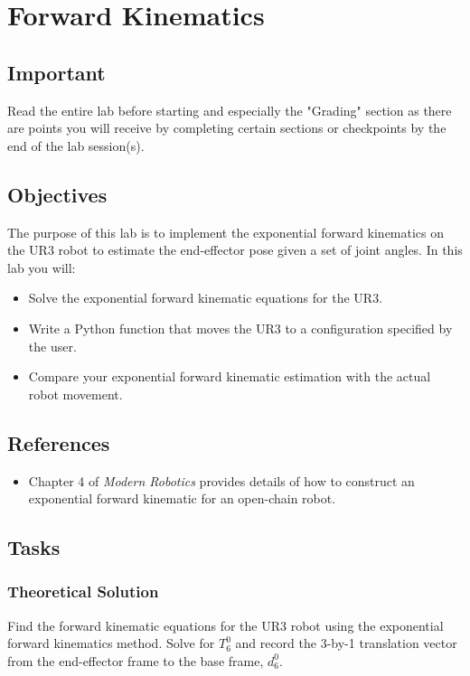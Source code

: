 \chapter{Forward Kinematics}
\section{Important}
Read the entire lab before starting and especially the "Grading" section as there are points you will receive by completing certain sections or checkpoints
by the end of the lab session(s). 
\section{Objectives}
The purpose of this lab is to implement the exponential forward kinematics on the UR3 robot to estimate the end-effector pose given a set of joint angles.  In this lab you will:
\begin{itemize}
	\item Solve the exponential forward kinematic equations for the UR3.
	\item Write a Python function that moves the UR3 to a configuration specified by the user.
	\item Compare your exponential forward kinematic estimation with the actual robot movement. 
\end{itemize}

\section{References}
\begin{itemize}
\item Chapter 4 of \textit{Modern Robotics} provides details of how to construct an exponential forward kinematic for an open-chain robot.
\end{itemize}

\section{Tasks}

\subsection{Theoretical Solution}
Find the forward kinematic equations for the UR3 robot using the exponential forward kinematics method.  Solve for $T_6^0$ and record the 3-by-1 translation vector from the end-effector frame to the base frame, $d^0_6$.

